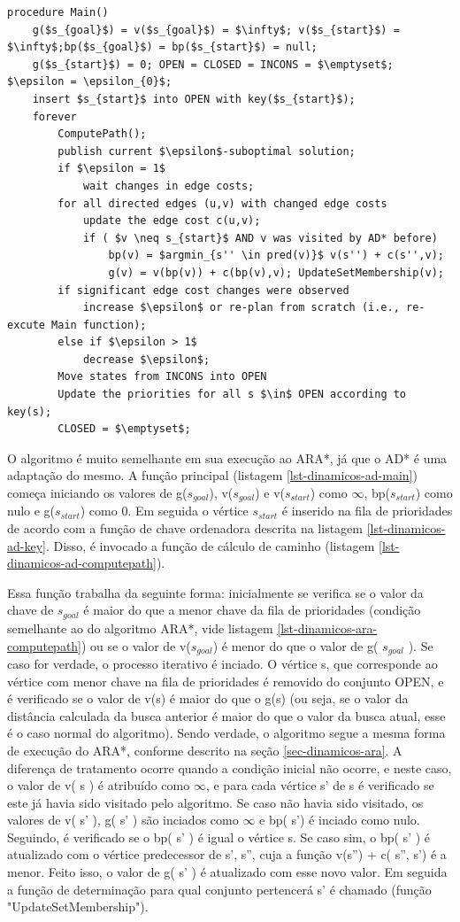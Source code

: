 \begin{lstlisting}[mathescape, label=lst-dinamicos-ad-main, caption=Algoritmo AD* - função principal, float=htpb]
procedure Main()
	g($s_{goal}$) = v($s_{goal}$) = $\infty$; v($s_{start}$) = $\infty$;bp($s_{goal}$) = bp($s_{start}$) = null;
	g($s_{start}$) = 0; OPEN = CLOSED = INCONS = $\emptyset$; $\epsilon = \epsilon_{0}$;
	insert $s_{start}$ into OPEN with key($s_{start}$);
	forever
		ComputePath();
		publish current $\epsilon$-suboptimal solution;
		if $\epsilon = 1$
			wait changes in edge costs;
		for all directed edges (u,v) with changed edge costs
			update the edge cost c(u,v);
			if ( $v \neq s_{start}$ AND v was visited by AD* before)
				bp(v) = $argmin_{s'' \in pred(v)}$ v(s'') + c(s'',v);
				g(v) = v(bp(v)) + c(bp(v),v); UpdateSetMembership(v);
		if significant edge cost changes were observed
			increase $\epsilon$ or re-plan from scratch (i.e., re-excute Main function);
		else if $\epsilon > 1$
			decrease $\epsilon$;
		Move states from INCONS into OPEN
		Update the priorities for all s $\in$ OPEN according to key(s);
		CLOSED = $\emptyset$;
\end{lstlisting}

O algoritmo é muito semelhante em sua execução ao ARA*, já que o AD* é uma adaptação do mesmo. A função principal (listagem \ref{lst-dinamicos-ad-main}) começa iniciando os valores de g($s_{goal}$), v($s_{goal}$) e v($s_{start}$) como $\infty$, bp($s_{start}$) como nulo e g($s_{start}$) como 0. Em seguida o vértice $s_{start}$ é inserido na fila de prioridades de acordo com  a função de chave ordenadora descrita na listagem \ref{lst-dinamicos-ad-key}. Disso, é invocado a função de cálculo de caminho (listagem \ref{lst-dinamicos-ad-computepath}).

Essa função trabalha da seguinte forma: inicialmente se verifica se o valor da chave de $s_{goal}$ é maior do que a menor chave da fila de prioridades (condição semelhante ao do algoritmo ARA*, vide listagem \ref{lst-dinamicos-ara-computepath}) ou se o valor de v($s_{goal}$) é menor do que o valor de g( $s_{goal}$ ). Se caso for verdade, o processo iterativo é inciado. O vértice s, que corresponde ao vértice com menor chave na fila de prioridades é removido do conjunto OPEN, e é verificado se o valor de v(s) é maior do que o g(s) (ou seja, se o valor da distância calculada da busca anterior é maior do que o valor da busca atual, esse é o caso normal do algoritmo). Sendo verdade, o algoritmo segue a mesma forma de execução do ARA*, conforme descrito na seção \ref{sec-dinamicos-ara}. A diferença de tratamento ocorre quando a condição inicial não ocorre, e neste caso, o valor de v( s ) é atribuído como $\infty$, e para cada vértice s' de s é verificado se este já havia sido visitado pelo algoritmo. Se caso não havia sido visitado, os valores de v( s' ), g( s' ) são inciados como $\infty$ e bp( s') é inciado como nulo. Seguindo, é verificado se o bp( s' ) é igual o vértice s. Se caso sim, o bp( s' ) é atualizado com o vértice predecessor de s', s'', cuja a função v(s'') + c( s'', s') é a menor. Feito isso, o valor de g( s' ) é atualizado com esse novo valor. Em seguida a função de determinação para qual conjunto pertencerá s' é chamado (função "UpdateSetMembership").

